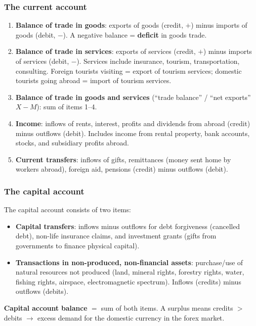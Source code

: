 \documentclass[a4paper,12pt]{article}
\begin{document}
\subsubsection*{The current account}
\begin{enumerate}
  \item \textbf{Balance of trade in goods}: exports of goods (credit, $+$) minus imports of goods (debit, $-$). A negative balance = \textbf{deficit} in goods trade.
  \item \textbf{Balance of trade in services}: exports of services (credit, $+$) minus imports of services (debit, $-$). Services include insurance, tourism, transportation, consulting. Foreign tourists visiting = export of tourism services; domestic tourists going abroad = import of tourism services.
  \item \textbf{Balance of trade in goods and services} (``trade balance'' / ``net exports'' $X - M$): sum of items 1--4.
  \item \textbf{Income}: inflows of rents, interest, profits and dividends from abroad (credit) minus outflows (debit). Includes income from rental property, bank accounts, stocks, and subsidiary profits abroad.
  \item \textbf{Current transfers}: inflows of gifts, remittances (money sent home by workers abroad), foreign aid, pensions (credit) minus outflows (debit).
\end{enumerate}
\subsubsection*{The capital account}
The capital account consists of two items:
\begin{itemize}
  \item \textbf{Capital transfers}: inflows minus outflows for debt forgiveness (cancelled debt), non-life insurance claims, and investment grants (gifts from governments to finance physical capital).
  \item \textbf{Transactions in non-produced, non-financial assets}: purchase/use of natural resources not produced (land, mineral rights, forestry rights, water, fishing rights, airspace, electromagnetic spectrum). Inflows (credits) minus outflows (debits).
\end{itemize}
\textbf{Capital account balance} $=$ sum of both items. A surplus means credits $>$ debits $\to$ excess demand for the domestic currency in the forex market.
\end{document}
